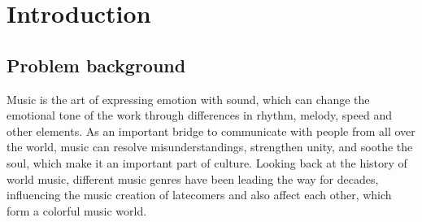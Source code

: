 \documentclass{mcmthesis}
\begin{document}
\begin{abstract}
\begin{spacing}{0.8}
To find out the artists who represent the music revolutionaries, the jump point is determined by the time series diagram. Before the jump point, the screening range is narrowed according to the characteristics of the genre. The similarity between the influencers and followers in the range is calculated, and the threshold is set to determine the number of effective followers of the influencers. By sorting, it is found that the Beatles and Bob Dylan can be called revolutionaries.
For pop music, the number of effective followers and dynamic correlation are used as evaluation indexes to find out the dynamic influencers in different periods and explain the sequence diagram of characteristics.

Finally, considering the relevant background, we analyze the influence of society, politics and technology on music.
\end{spacing}


\begin{keywords}
network; decomposition; similarity; Duncan method; revolutionary
\end{keywords}
\end{abstract}
\maketitle
\begin{spacing}{0.5}  %
\tableofcontents
\end{spacing}
\newpage
\section{Introduction}
\subsection{Problem background}
 Music is the art of expressing emotion with sound, which can change the emotional tone of the work through differences in rhythm, melody, speed and other elements. As an important bridge to communicate with people from all over the world, music can resolve misunderstandings, strengthen unity, and soothe the soul, which make it an important part of culture. Looking back at the history of world music, different music genres have been leading the way for decades, influencing the music creation of latecomers and also affect each other, which form a colorful music world. 
\end{document}

